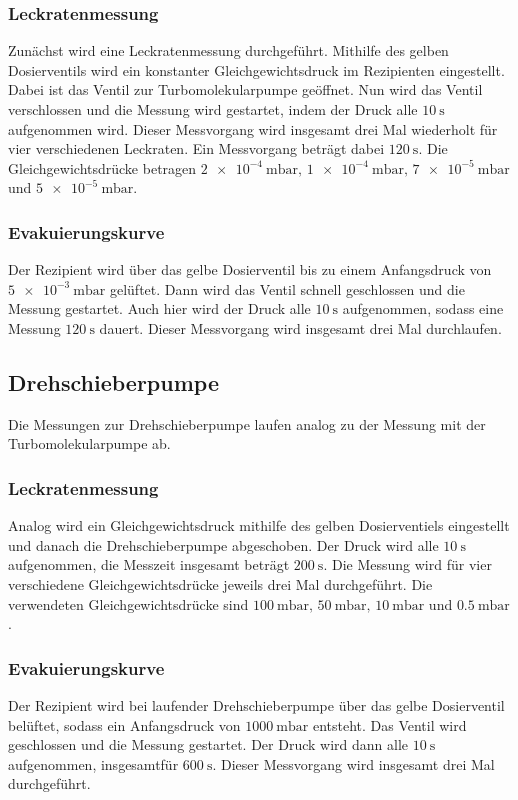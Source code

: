             \subsubsection{Leckratenmessung}
                Zunächst wird eine Leckratenmessung durchgeführt.
                Mithilfe des gelben Dosierventils wird ein konstanter Gleichgewichtsdruck im Rezipienten eingestellt.
                Dabei ist das Ventil zur Turbomolekularpumpe geöffnet.
                Nun wird das Ventil verschlossen und die Messung wird gestartet, indem der Druck alle $\SI{10}{\second}$ aufgenommen wird.
                Dieser Messvorgang wird insgesamt drei Mal wiederholt für vier verschiedenen Leckraten.
                Ein Messvorgang beträgt dabei $\SI{120}{\second}$.
                Die Gleichgewichtsdrücke betragen $\SI{2e-4}{\milli\bar}, \, \SI{1e-4}{\milli\bar}, \, \SI{7e-5}{\milli\bar}$ und $\SI{5e-5}{\milli\bar}$.

            \subsubsection{Evakuierungskurve}
                Der Rezipient wird über das gelbe Dosierventil bis zu einem Anfangsdruck von $\SI{5e-3}{\milli\bar}$ gelüftet.
                Dann wird das Ventil schnell geschlossen und die Messung gestartet.
                Auch hier wird der Druck alle $\SI{10}{\second}$ aufgenommen, sodass eine Messung $\SI{120}{\second}$ dauert.
                Dieser Messvorgang wird insgesamt drei Mal durchlaufen.

        \subsection{Drehschieberpumpe}
            Die Messungen zur Drehschieberpumpe laufen analog zu der Messung mit der Turbomolekularpumpe ab.
            \subsubsection{Leckratenmessung}
                Analog wird ein Gleichgewichtsdruck mithilfe des gelben Dosierventiels eingestellt und danach die Drehschieberpumpe abgeschoben.
                Der Druck wird alle $\SI{10}{\second}$ aufgenommen, die Messzeit insgesamt beträgt $\SI{200}{\second}$.
                Die Messung wird für vier verschiedene Gleichgewichtsdrücke jeweils drei Mal durchgeführt.
                Die verwendeten Gleichgewichtsdrücke sind $\SI{100}{\milli\bar},\, \SI{50}{\milli\bar},\, \SI{10}{\milli\bar}$ und $\SI{0.5}{\milli\bar}$.
            \subsubsection{Evakuierungskurve}
                Der Rezipient wird bei laufender Drehschieberpumpe über das gelbe Dosierventil belüftet, sodass ein Anfangsdruck von $\SI{1000}{\milli\bar}$ entsteht.
                Das Ventil wird geschlossen und die Messung gestartet.
                Der Druck wird dann alle $\SI{10}{\second}$ aufgenommen, insgesamtfür $\SI{600}{\second}$.
                Dieser Messvorgang wird insgesamt drei Mal durchgeführt.